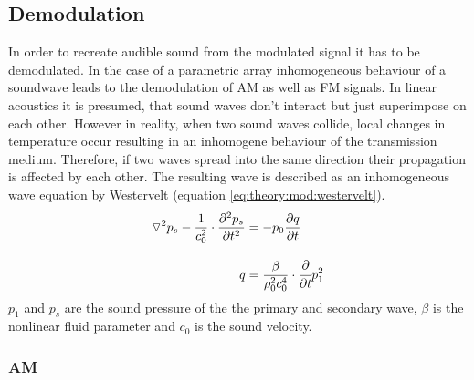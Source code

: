 \subsection{Demodulation}

In order to recreate audible sound from the modulated signal it has to be demodulated. In the case of a parametric array inhomogeneous behaviour of a soundwave leads to the demodulation of AM as well as FM signals.\p
%
In linear acoustics it is presumed, that sound waves don't interact but just superimpose on each other. However in reality, when two sound waves collide, local changes in temperature occur resulting in an inhomogene behaviour of the transmission medium. Therefore, if two waves spread into the same direction their propagation is affected by each other. The resulting wave is described as an inhomogeneous wave equation by Westervelt (equation \ref{eq:theory:mod:westervelt}).\cite{westervelt_parametric_1963}\cite{yoneyama_audio_1983}
%
\begin{align}
  \triangledown^2 p_s - \frac{1}{c_0^2} \cdot \frac{\partial^2 p_s}{\partial t^2} & = - p_0 \frac{\partial q}{\partial t}\label{eq:theory:mod:westervelt}\pmath
  q &= \frac{\beta}{\rho_0^2 c_0^4} \cdot \cfrac{\partial }{\partial t} p_1^2 \label{eq:theory:mod:westervelt_q}
\end{align}
%
$p_1$ and $p_s$ are the sound pressure of the the primary and secondary wave, $\beta$ is the nonlinear fluid parameter and $c_0$ is the sound velocity.

\subsubsection*{AM}

